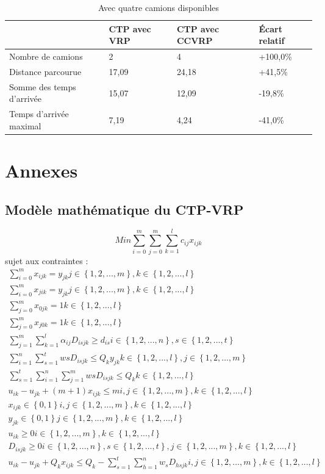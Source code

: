 \documentclass[12pt, a4paper, onecolumn, twoside,french,cleardoublepage=plain,openany]{article}
\begin{document}
\begin{table}[H] \centering \begin{tabular}{@{}llll@{}} \toprule %
 & CTP avec VRP & CTP avec CCVRP & Écart relatif \\ \midrule
Nombre de camions & 2 & 4 & +100,0\% \\
Distance parcourue & 17,09 & 24,18 & +41,5\% \\
Somme des temps d'arrivée & 15,07 & 12,09 & -19,8\% \\
Temps d'arrivée maximal & 7,19 & 4,24 & -41,0\% \\ \bottomrule
\end{tabular} \caption{Avec quatre camions disponibles} \label{quatre_camions}
\end{table}

\section*{Annexes}
\subsection{Modèle mathématique du CTP-VRP}\label{modele_ctp_vrp}
\begin{equation}
Min \sum_{i=0}^{m}\sum_{j=0}^{m}\sum_{k=1}^{l}c_{ij}x_{ijk}
\end{equation}
sujet aux contraintes :
\begin{gather}
\sum_{i=0}^{m}x_{ijk} = y_{jk}   j\in\left\{1,2,...,m\right\}, k\in\left\{1,2,...,l\right\} \\ 
\sum_{i=0}^{m}x_{jik} = y_{jk}   j\in\left\{1,2,...,m\right\}, k\in\left\{1,2,...,l\right\} \\ 
\sum_{j=0}^{m}x_{0jk} = 1   k\in\left\{1,2,...,l\right\} \\ 
\sum_{j=0}^{m}x_{j0k} = 1   k\in\left\{1,2,...,l\right\} \\
\sum_{j=1}^{m}\sum_{k=1}^{l}\alpha_{ij}D_{isjk} \geq d_{is}    i\in\left\{1,2,...,n\right\}, s\in\left\{1,2,...,t\right\} \\
\sum_{i=1}^{n}\sum_{s=1}^{t}w{s}D_{isjk} \leq Q_{k}y_{jk}    k\in\left\{1,2,...,l\right\}, j\in\left\{1,2,...,m\right\} \\
\sum_{s=1}^{t}\sum_{i=1}^{n}\sum_{j=1}^{m}w{s}D_{isjk} \leq Q_{k}    k\in\left\{1,2,...,l\right\} \\
u_{ik} - u_{jk} + (m + 1)x_{ijk} \leq m   i,j\in\left\{1,2,...,m\right\}, k\in\left\{1,2,...,l\right\} \\
x_{ijk} \in\left\{0,1\right\}   i,j\in\left\{1,2,...,m\right\}, k\in\left\{1,2,...,l\right\} \\
y_{jk} \in\left\{0,1\right\}   j\in\left\{1,2,...,m\right\}, k\in\left\{1,2,...,l\right\}\\ 
u_{ik} \geq 0   i\in\left\{1,2,...,m\right\}, k\in\left\{1,2,...,l\right\}\\ 
D_{isjk} \geq 0   i\in\left\{1,2,...,n\right\}, s\in\left\{1,2,...,t\right\}, j\in\left\{1,2,...,m\right\}, k\in\left\{1,2,...,l\right\}\\ 
u_{ik} - u_{jk} + Q_{k}x_{ijk} \leq Q_{k} - \sum_{s=1}^{t}\sum_{h=1}^{n}w_{s}D_{hsjk}   i,j\in\left\{1,2,...,m\right\}, k\in\left\{1,2,...,l\right\} \\
\end{gather}
\end{document}
